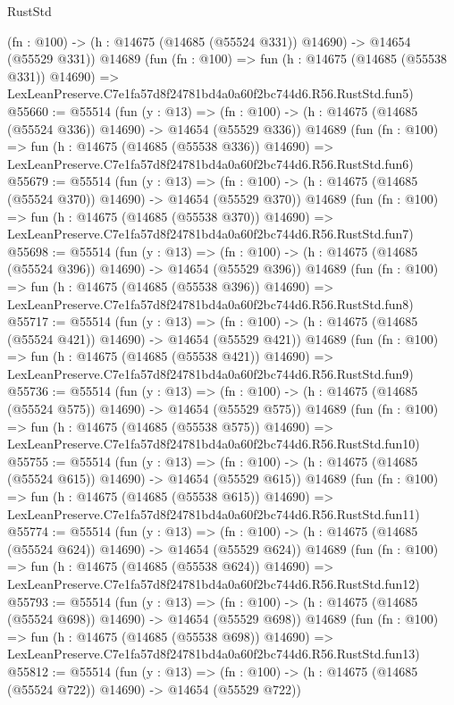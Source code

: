 \begin{lexlean}{RustStd}
\begin{coremodule}
    (fn : @100) -> (h : @14675 (@14685 (@55524 @331)) @14690) -> @14654 (@55529 @331))
    @14689
    (fun (fn : @100) =>
    fun (h : @14675 (@14685 (@55538 @331)) @14690) =>
    LexLeanPreserve.C7e1fa57d8f24781bd4a0a60f2bc744d6.R56.RustStd.fun5)
@55660 := @55514
    (fun (y : @13) =>
    (fn : @100) -> (h : @14675 (@14685 (@55524 @336)) @14690) -> @14654 (@55529 @336))
    @14689
    (fun (fn : @100) =>
    fun (h : @14675 (@14685 (@55538 @336)) @14690) =>
    LexLeanPreserve.C7e1fa57d8f24781bd4a0a60f2bc744d6.R56.RustStd.fun6)
@55679 := @55514
    (fun (y : @13) =>
    (fn : @100) -> (h : @14675 (@14685 (@55524 @370)) @14690) -> @14654 (@55529 @370))
    @14689
    (fun (fn : @100) =>
    fun (h : @14675 (@14685 (@55538 @370)) @14690) =>
    LexLeanPreserve.C7e1fa57d8f24781bd4a0a60f2bc744d6.R56.RustStd.fun7)
@55698 := @55514
    (fun (y : @13) =>
    (fn : @100) -> (h : @14675 (@14685 (@55524 @396)) @14690) -> @14654 (@55529 @396))
    @14689
    (fun (fn : @100) =>
    fun (h : @14675 (@14685 (@55538 @396)) @14690) =>
    LexLeanPreserve.C7e1fa57d8f24781bd4a0a60f2bc744d6.R56.RustStd.fun8)
@55717 := @55514
    (fun (y : @13) =>
    (fn : @100) -> (h : @14675 (@14685 (@55524 @421)) @14690) -> @14654 (@55529 @421))
    @14689
    (fun (fn : @100) =>
    fun (h : @14675 (@14685 (@55538 @421)) @14690) =>
    LexLeanPreserve.C7e1fa57d8f24781bd4a0a60f2bc744d6.R56.RustStd.fun9)
@55736 := @55514
    (fun (y : @13) =>
    (fn : @100) -> (h : @14675 (@14685 (@55524 @575)) @14690) -> @14654 (@55529 @575))
    @14689
    (fun (fn : @100) =>
    fun (h : @14675 (@14685 (@55538 @575)) @14690) =>
    LexLeanPreserve.C7e1fa57d8f24781bd4a0a60f2bc744d6.R56.RustStd.fun10)
@55755 := @55514
    (fun (y : @13) =>
    (fn : @100) -> (h : @14675 (@14685 (@55524 @615)) @14690) -> @14654 (@55529 @615))
    @14689
    (fun (fn : @100) =>
    fun (h : @14675 (@14685 (@55538 @615)) @14690) =>
    LexLeanPreserve.C7e1fa57d8f24781bd4a0a60f2bc744d6.R56.RustStd.fun11)
@55774 := @55514
    (fun (y : @13) =>
    (fn : @100) -> (h : @14675 (@14685 (@55524 @624)) @14690) -> @14654 (@55529 @624))
    @14689
    (fun (fn : @100) =>
    fun (h : @14675 (@14685 (@55538 @624)) @14690) =>
    LexLeanPreserve.C7e1fa57d8f24781bd4a0a60f2bc744d6.R56.RustStd.fun12)
@55793 := @55514
    (fun (y : @13) =>
    (fn : @100) -> (h : @14675 (@14685 (@55524 @698)) @14690) -> @14654 (@55529 @698))
    @14689
    (fun (fn : @100) =>
    fun (h : @14675 (@14685 (@55538 @698)) @14690) =>
    LexLeanPreserve.C7e1fa57d8f24781bd4a0a60f2bc744d6.R56.RustStd.fun13)
@55812 := @55514
    (fun (y : @13) =>
    (fn : @100) -> (h : @14675 (@14685 (@55524 @722)) @14690) -> @14654 (@55529 @722))

\end{coremodule}
\end{lexlean}
